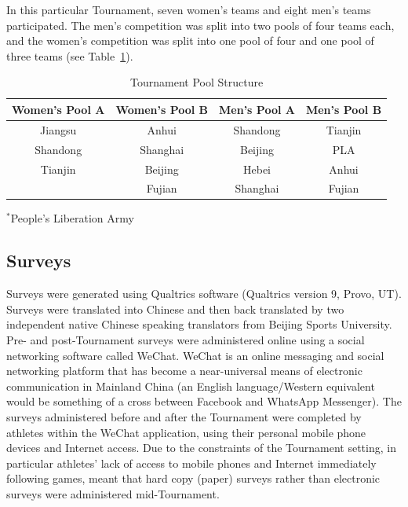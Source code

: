 In this particular Tournament, seven women's teams and eight men's teams participated.  The men’s competition was split into two pools of four teams each, and the women’s competition was split into one pool of four and one pool of three teams (see Table~\ref{tab:poolStructure}). \\


\begin{table}[htpb]\caption{Tournament Pool Structure}
  \begin{center}
    \begin{small}
        \begin{tabular}{| c | c || c | c |}
          \hline
          \bf Women's Pool A & \bf Women's Pool B &  \bf Men's Pool A & \bf  Men's Pool B \\
          \hline
          Jiangsu & Anhui & Shandong & Tianjin \\
          Shandong & Shanghai & Beijing & PLA\superscript{*} \\
          Tianjin & Beijing & Hebei & Anhui \\
             & Fujian & Shanghai & Fujian \\
             \hline
        \end{tabular}
          \end{small}
        \end{center}

        \begin{footnotesize}
          $^*$People's Liberation Army
        \end{footnotesize}

  \label{tab:poolStructure}
    \end{table}



\subsection{Surveys}
Surveys were generated using Qualtrics software (Qualtrics version 9, Provo, UT). Surveys were translated into Chinese and then back translated by two independent native Chinese speaking translators from Beijing Sports University.  Pre- and post-Tournament surveys were administered online using a social networking software called WeChat. WeChat is an online messaging and social networking platform that has become a near-universal means of electronic communication in Mainland China (an English language/Western equivalent would be something of a cross between Facebook and WhatsApp Messenger). The surveys administered before and after the Tournament were completed by athletes within the WeChat application, using their personal mobile phone devices and Internet access. Due to the constraints of the Tournament setting, in particular athletes’ lack of access to mobile phones and Internet immediately following games, meant that hard copy (paper) surveys rather than electronic surveys were administered mid-Tournament.


